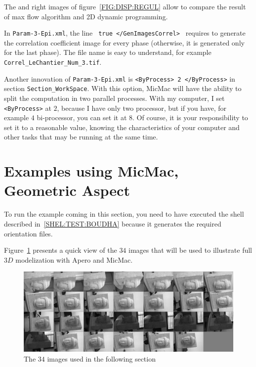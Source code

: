 The  and right images of figure~\ref{FIG:DISP:REGUL}  allow to compare the result
of max flow algorithm and 2D dynamic programming.

In {\tt Param-3-Epi.xml}, the line {\tt  <GenImagesCorrel > true </GenImagesCorrel> }
requires to generate the correlation coefficient image for every phase
(otherwise, it is generated only for the last phase). The file name  is
easy to understand, for example  {\tt Correl\_LeChantier\_Num\_3.tif}.


Another innovation of {\tt Param-3-Epi.xml} is {\tt  <ByProcess> 2 </ByProcess>} in
section {\tt Section\_WorkSpace}. With this option, MicMac will have the ability
to split the computation in two parallel processes. With my computer, I set
{\tt  <ByProcess>} at $2$, because I have only two processor, but if you have,
for example $4$ bi-processor, you can set it at $8$. Of course, it is your responsibility
to set it to a reasonable value, knowing the characteristics of your computer
and other tasks that may be running at the same time.


\section{Examples using MicMac, Geometric Aspect}

To run the example coming in this section, you need to have executed the shell
described in~\ref{SHEL:TEST:BOUDHA}
because it generates the required orientation files.

Figure~\ref{FIG:ALL:BOUDHA} presents a quick view of the $34$
images that will be used to illustrate full $3D$ modelization
with Apero and MicMac.

\begin{figure}
\includegraphics[width=150mm]{FIGS/Boudhas/Planche.jpg}
\caption{The $34$ images used in the following section}
\label{FIG:ALL:BOUDHA}
\end{figure}

